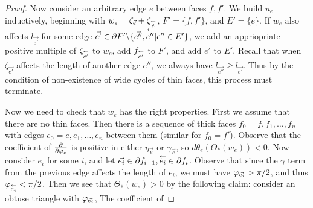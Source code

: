 \begin{proof}
Now consider an arbitrary edge $e$ between faces $f,f'$.
We build $u_e$ inductively, beginning with
$w_e = \zeta_{\vec{e}} + \zeta_{\overset{\leftarrow}{e}}$,
$F' = \{f, f'\}$, and $E' = \{e\}$.
If $w_e$ also affects $l_{\vec{e'}}$ for some edge
$\vec{e'} \in \partial F' \backslash\{\vec{e''},\overset{\leftarrow}{e''} | e''\in E'\}$,
we add an appriopriate positive multiple
of $\zeta_{\overset{\leftarrow}{e'}}$ to $w_e$,
add $f_{\overset{\leftarrow}{e'}}$ to $F'$,
and add $e'$ to $E'$.
Recall that when $\zeta_{\vec{e'}}$ affects
the length of another edge $e''$,
we always have $l_{\vec{e''}} \geq l_{\vec{e'}}$.
Thus by the condition of non-existence of wide cycles of thin faces,
this process must terminate.


Now we need to check that $w_e$ has the right properties.
First we assume that there are no thin faces.
Then there is a sequence of thick faces
$f_0 = f, f_1, \ldots, f_n$
with edges $e_0 = e, e_1, \ldots, e_n$ between them
(similar for $f_0 = f'$).
Observe that the coefficient of ${\frac{\partial}{\partial \varphi_{\vec{e}}}}$
is positive in either $\eta_{\vec{e}}$ or $\gamma_{\vec{e}}$,
so $d\theta_e(\Theta_*(w_e)) < 0$.
Now consider $e_i$ for some $i$,
and let $\vec{e_i} \in \partial f_{i-1}, \overset{\leftarrow}{e_i} \in \partial f_i$.
Observe that since the $\gamma$ term from the previous edge
affects the length of $e_i$,
we must have $\varphi_{\vec{e_i}} > \pi/2$,
and thus $\varphi_{\overset{\leftarrow}{e_i}} < \pi/2$.
Then we see that $\Theta_*(w_e) > 0$
by the following claim:
consider an obtuse triangle
with $\varphi_{\vec{e_i}}$,
The coefficient of 


\end{proof}

